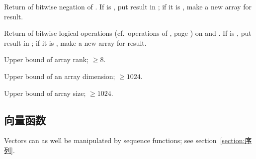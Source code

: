 \begin{LIST}{1cm}
  {
  Return  of bitwise negation of . If  is \T, put
  result in ; if it is \NIL, make a new array for
  result. 
  }

  {
  Return  of bitwise logical operations
  (cf.\ operations of , page \pageref{section:逻辑函数}) on
   and  .  If  is \T, put result in
  ; if it is \NIL, make a new array for
  result. 
  }

  {
  Upper bound of array rank; $\geq 8$.
  }

  {
  Upper bound of an array dimension; $\geq 1024$.
  }

  {
  Upper bound of array size; $\geq 1024$.
  }

\end{LIST}


\subsection{向量函数} 

Vectors can as well be manipulated by sequence functions; see
section~\ref{section:序列}. 

